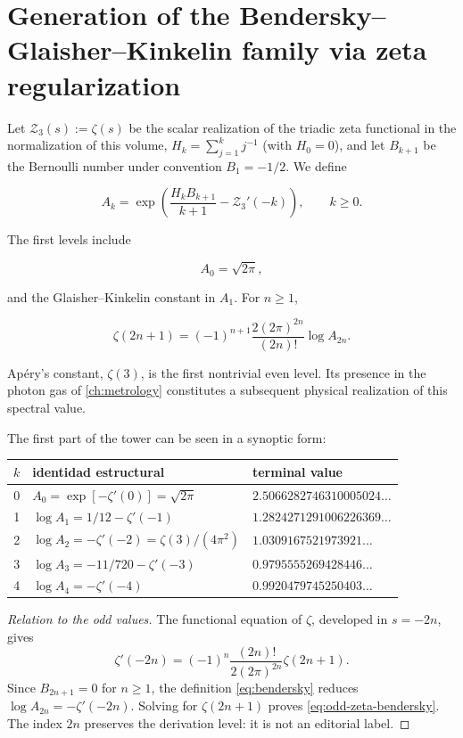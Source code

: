 \section{Generation of the Bendersky--Glaisher--Kinkelin family via zeta regularization}

Let \(\mathcal Z_3(s):=\zeta(s)\) be the scalar realization of the triadic
zeta functional in the normalization of this volume,
\(H_k=\sum_{j=1}^k j^{-1}\) (with \(H_0=0\)), and let \(B_{k+1}\) be the Bernoulli number
under convention \(B_1=-1/2\). We define

\begin{equation}
A_k=\exp\!\left(
\frac{H_kB_{k+1}}{k+1}-\mathcal Z_3'(-k)
\right),\qquad k\ge0.
\label{eq:bendersky}
\end{equation}

The first levels include

\[
A_0=\sqrt{2\pi},
\]

and the Glaisher--Kinkelin constant in \(A_1\). For \(n\ge1\),

\begin{equation}
\zeta(2n+1)=(-1)^{n+1}
\frac{2(2\pi)^{2n}}{(2n)!}\log A_{2n}.
\label{eq:odd-zeta-bendersky}
\end{equation}

Apéry's constant, \(\zeta(3)\), is the first nontrivial even level.
Its presence in the photon gas of \cref{ch:metrology} constitutes a
subsequent physical realization of this spectral value.

The first part of the tower can be seen in a synoptic form:
\begin{center}
\small
\begin{tabular}{@{}cll@{}}
\toprule
\(k\) & identidad estructural & terminal value\\
\midrule
0 & \(A_0=\exp[-\zeta'(0)]=\sqrt{2\pi}\)
  & \(2.5066282746310005024\ldots\)\\
1 & \(\log A_1=1/12-\zeta'(-1)\)
  & \(1.2824271291006226369\ldots\)\\
2 & \(\log A_2=-\zeta'(-2)=\zeta(3)/(4\pi^2)\)
  & \(1.0309167521973921\ldots\)\\
3 & \(\log A_3=-11/720-\zeta'(-3)\)
  & \(0.9795555269428446\ldots\)\\
4 & \(\log A_4=-\zeta'(-4)\)
  & \(0.9920479745250403\ldots\)\\
\bottomrule
\end{tabular}
\end{center}

\begin{proof}[Relation to the odd values]
The functional equation of \(\zeta\), developed in \(s=-2n\), gives
\begin{equation}
\zeta'(-2n)=(-1)^n
\frac{(2n)!}{2(2\pi)^{2n}}\zeta(2n+1).
\label{eq:zeta-derivative-even-negative}
\end{equation}
Since \(B_{2n+1}=0\) for \(n\ge1\), the definition
\cref{eq:bendersky} reduces \(\log A_{2n}=-\zeta'(-2n)\). Solving for
\(\zeta(2n+1)\) proves \cref{eq:odd-zeta-bendersky}. The index \(2n\)
preserves the derivation level: it is not an editorial label.
\end{proof}

